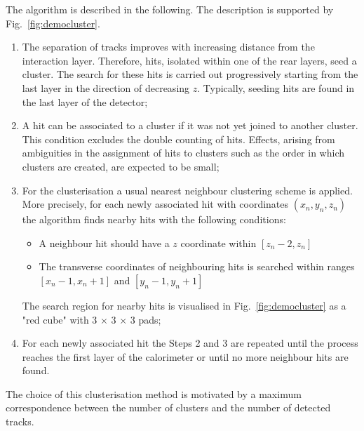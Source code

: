 
The algorithm is described in the following. The description is supported by Fig.\ \ref{fig:democluster}.
\begin{enumerate}
	\item The separation of tracks improves with increasing distance from the interaction layer. Therefore, hits, isolated within one of the rear layers, seed a cluster. The search for these hits is carried out progressively starting from the last layer in the direction of decreasing $z$.
	Typically, seeding hits are found in the last layer of the detector;
	\item A hit can be associated to a cluster if it was not yet joined to another cluster. This condition excludes the double counting of hits. Effects, arising from ambiguities in the assignment of hits to clusters such as the order in which clusters are created, are expected to be small;%
	\item For the clusterisation a usual nearest neighbour clustering scheme is applied. More precisely, for each newly associated hit with coordinates $(x_n,y_n,z_n)$ the algorithm finds nearby hits with the following conditions:
	\begin{itemize}
		\item A neighbour hit should have a $z$ coordinate within $[z_n-2,z_n]$
		\item The transverse coordinates of neighbouring hits is searched within ranges $[x_n-1,x_n+1]$ and $[y_n-1,y_n+1]$
	\end{itemize}
	The search region for nearby hits is visualised  in Fig.~\ref{fig:democluster} as a "red cube" with 3 $\times$ 3 $\times$ 3 pads; 
	\item  For each newly associated hit the Steps 2 and 3 are repeated until the process reaches the first layer of the calorimeter or until no more neighbour hits are found.
\end{enumerate}
The choice of this clusterisation method is motivated by a maximum correspondence between the number of clusters and the number of detected tracks.

